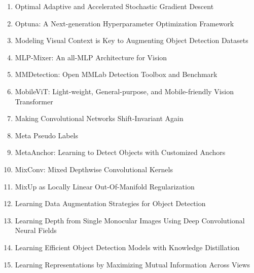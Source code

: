 \documentclass[acmlarge]{acmart}
\begin{document}
\begin{enumerate}
	\item Optimal Adaptive and Accelerated Stochastic Gradient Descent \cite{Deng2018OptimalAA} 

	\item Optuna: A Next-generation Hyperparameter Optimization Framework \cite{Akiba2019OptunaAN} 

	\item Modeling Visual Context is Key to Augmenting Object Detection Datasets \cite{Dvornik2018ModelingVC} 

	\item MLP-Mixer: An all-MLP Architecture for Vision \cite{Tolstikhin2021MLPMixerAA} 

	\item MMDetection: Open MMLab Detection Toolbox and Benchmark \cite{Chen2019MMDetectionOM} 

	\item MobileViT: Light-weight, General-purpose, and Mobile-friendly Vision Transformer \cite{Mehta2021MobileViTLG} 

	\item Making Convolutional Networks Shift-Invariant Again \cite{Zhang2019MakingCN} 

	\item Meta Pseudo Labels \cite{Pham2021MetaPL} 

	\item MetaAnchor: Learning to Detect Objects with Customized Anchors \cite{Yang2018MetaAnchorLT} 

	\item MixConv: Mixed Depthwise Convolutional Kernels \cite{Tan2019MixConvMD} 

	\item MixUp as Locally Linear Out-Of-Manifold Regularization \cite{Guo2019MixUpAL} 

	\item Learning Data Augmentation Strategies for Object Detection \cite{Zoph2020LearningDA} 

	\item Learning Depth from Single Monocular Images Using Deep Convolutional Neural Fields \cite{Liu2016LearningDF} 

	\item Learning Efficient Object Detection Models with Knowledge Distillation \cite{Chen2017LearningEO} 

	\item Learning Representations by Maximizing Mutual Information Across Views \cite{Bachman2019LearningRB} 


\end{enumerate}
\end{document}
